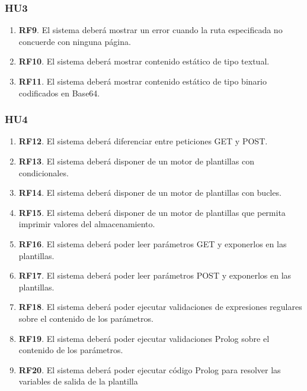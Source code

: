 \documentclass[openright,twoside,12pt]{book}
\begin{document}
\subsubsection{HU3}
\begin{enumerate}
    \item\textbf{RF9}. El sistema deberá mostrar un error cuando la ruta especificada no concuerde con ninguna página.
    \item\textbf{RF10}. El sistema deberá mostrar contenido estático de tipo textual.
    \item\textbf{RF11}. El sistema deberá mostrar contenido estático de tipo binario codificados en Base64.
\end{enumerate}

\subsubsection{HU4}
\begin{enumerate}
    \item\textbf{RF12}. El sistema deberá diferenciar entre peticiones GET y POST.
    \item\textbf{RF13}. El sistema deberá disponer de un motor de plantillas con condicionales.
    \item\textbf{RF14}. El sistema deberá disponer de un motor de plantillas con bucles.
    \item\textbf{RF15}. El sistema deberá disponer de un motor de plantillas que permita imprimir valores del almacenamiento.
    \item\textbf{RF16}. El sistema deberá poder leer parámetros GET y exponerlos en las plantillas.
    \item\textbf{RF17}. El sistema deberá poder leer parámetros POST y exponerlos en las plantillas.
    \item\textbf{RF18}. El sistema deberá poder ejecutar validaciones de expresiones regulares sobre el contenido de los parámetros.
    \item\textbf{RF19}. El sistema deberá poder ejecutar validaciones Prolog sobre el contenido de los parámetros. 
    \item\textbf{RF20}. El sistema deberá poder ejecutar código Prolog para resolver las variables de salida de la plantilla
\end{enumerate}
\end{document}
